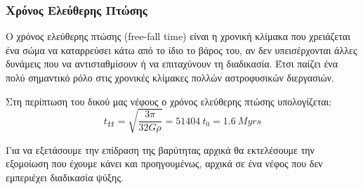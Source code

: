 \documentclass[article,a4paper,11.2pt]{memoir}
\numberwithin{equation}{subsection}
\begin{document}
	
	\subsubsection{Χρόνος Ελεύθερης Πτώσης}
	Ο χρόνος ελεύθερης πτώσης (free-fall time) είναι η χρονική κλίμακα που χρειάζεται ένα σώμα να καταρρεύσει κάτω από το ίδιο το βάρος του, αν δεν υπεισέρχονται άλλες δυνάμεις που να αντισταθμίσουν ή να επιταχύνουν τη διαδικασία. Έτσι παίζει ένα πολύ σημαντικό ρόλο στις χρονικές κλίμακες πολλών αστροφυσικών διεργασιών.
	
	Στη περίπτωση του δικού μας νέφους ο χρόνος ελεύθερης πτώσης υπολογίζεται:
	\begin{equation}
		t_\texttt{ff}=\sqrt{\frac{3\pi}{32G\rho}} = \SI{51404}{t_0} = \SI{1.6}{Myrs}
	\end{equation}
	
	Για να εξετάσουμε την επίδραση της βαρύτητας αρχικά θα εκτελέσουμε την εξομοίωση που έχουμε κάνει και προηγουμένως, αρχικά σε ένα νέφος που δεν εμπεριέχει διαδικασία ψύξης.
	
\end{document}
